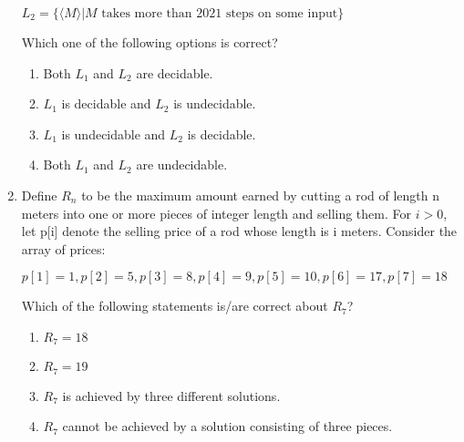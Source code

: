\documentclass[a4paper, 11pt]{article}
\begin{document}
\begin{enumerate}
\begin{center}
    $L_2 = \{\langle M \rangle | M \text{ takes more than 2021 steps on some input}\}$ 
    \end{center}
    Which one of the following options is correct?
    \begin{enumerate}
        \item Both $L_1$ and $L_2$ are decidable.
        \item $L_1$ is decidable and $L_2$ is undecidable.
        \item $L_1$ is undecidable and $L_2$ is decidable.
        \item Both $L_1$ and $L_2$ are undecidable.
    \end{enumerate}
    \hfill{}
    \item Define $R_n$ to be the maximum amount earned by cutting a rod of length n meters into one or more pieces of integer length and selling them. For $i>0$, let p[i] denote the selling price of a rod whose length is i meters. Consider the array of prices:
    \begin{center}
    $p[1]=1, p[2]=5, p[3]=8, p[4]=9, p[5]=10, p[6]=17, p[7]=18$
    \end{center}    
    Which of the following statements is/are correct about $R_7$?
    \begin{enumerate}
        \item $R_7 = 18$
        \item $R_7 = 19$
        \item $R_7$ is achieved by three different solutions.
        \item $R_7$ cannot be achieved by a solution consisting of three pieces.
    \end{enumerate}
    \hfill{}
    

\end{enumerate}
\end{document}
